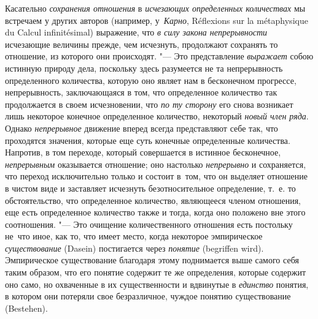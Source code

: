 Касательно {\em сохранения отношения} в {\em исчезающих определенных
количествах} мы встречаем у других авторов (например, у~{\em Карно},
Ré\-flexi\-ons sur la méta\-phy\-sique du Cal\-cul in\-fini\-tési\-mal)
выражение, что {\em в силу закона непрерывности} исчезающие величины прежде,
чем исчезнуть, продолжают сохранять то отношение, из которого они происходят.
"--- Это представление {\em выражает} собою истинную природу дела, поскольку
здесь разумеется не та непрерывность определенного количества, которую оно
являет нам в бесконечном прогрессе, непрерывность, заключающаяся в том, что
определенное количество так продолжается в своем исчезновении, что
{\em по ту сторону} его снова возникает лишь некоторое конечное определенное
количество, некоторый {\em новый член ряда}. Однако {\em непрерывное} движение
вперед всегда представляют себе так, что проходятся значения, которые еще суть
конечные определенные количества. Напротив, в том переходе, который совершается
в истинное бесконечное, {\em непрерывным} оказывается отношение; оно настолько
{\em непрерывно} и сохраняется, что переход исключительно только и состоит
в~том, что он выделяет отношение в чистом виде и заставляет исчезнуть
безотносительное определение, т.~е. то обстоятельство, что определенное
количество, являющееся членом отношения, еще есть определенное количество также
и тогда, когда оно положено вне этого соотношения. "--- Это очищение
количественного отношения есть постольку не~что иное, как то, что имеет место,
когда некоторое эмпирическое {\em существование} (Dasein) постигается через
{\em понятие} (begriffen wird). Эмпирическое существование благодаря этому
поднимается выше самого себя таким образом, что его понятие содержит те же
определения, которые содержит оно само, но охваченные в их существенности и
вдвинутые в {\em единство} понятия, в котором они потеряли свое безразличное,
чуждое понятию существование (Bestehen).

